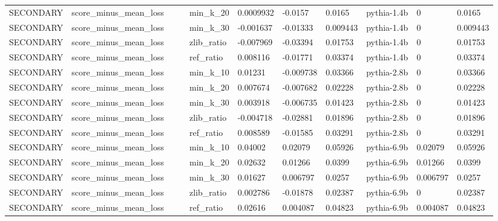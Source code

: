 \begin{tabular}{lllllllllll}
SECONDARY & score\_minus\_mean\_loss &  &  & min\_k\_20 & 0.0009932 & -0.0157 & 0.0165 & pythia-1.4b & 0 & 0.0165 \\
SECONDARY & score\_minus\_mean\_loss &  &  & min\_k\_30 & -0.001637 & -0.01333 & 0.009443 & pythia-1.4b & 0 & 0.009443 \\
SECONDARY & score\_minus\_mean\_loss &  &  & zlib\_ratio & -0.007969 & -0.03394 & 0.01753 & pythia-1.4b & 0 & 0.01753 \\
SECONDARY & score\_minus\_mean\_loss &  &  & ref\_ratio & 0.008116 & -0.01771 & 0.03374 & pythia-1.4b & 0 & 0.03374 \\
SECONDARY & score\_minus\_mean\_loss &  &  & min\_k\_10 & 0.01231 & -0.009738 & 0.03366 & pythia-2.8b & 0 & 0.03366 \\
SECONDARY & score\_minus\_mean\_loss &  &  & min\_k\_20 & 0.007674 & -0.007682 & 0.02228 & pythia-2.8b & 0 & 0.02228 \\
SECONDARY & score\_minus\_mean\_loss &  &  & min\_k\_30 & 0.003918 & -0.006735 & 0.01423 & pythia-2.8b & 0 & 0.01423 \\
SECONDARY & score\_minus\_mean\_loss &  &  & zlib\_ratio & -0.004718 & -0.02881 & 0.01896 & pythia-2.8b & 0 & 0.01896 \\
SECONDARY & score\_minus\_mean\_loss &  &  & ref\_ratio & 0.008589 & -0.01585 & 0.03291 & pythia-2.8b & 0 & 0.03291 \\
SECONDARY & score\_minus\_mean\_loss &  &  & min\_k\_10 & 0.04002 & 0.02079 & 0.05926 & pythia-6.9b & 0.02079 & 0.05926 \\
SECONDARY & score\_minus\_mean\_loss &  &  & min\_k\_20 & 0.02632 & 0.01266 & 0.0399 & pythia-6.9b & 0.01266 & 0.0399 \\
SECONDARY & score\_minus\_mean\_loss &  &  & min\_k\_30 & 0.01627 & 0.006797 & 0.0257 & pythia-6.9b & 0.006797 & 0.0257 \\
SECONDARY & score\_minus\_mean\_loss &  &  & zlib\_ratio & 0.002786 & -0.01878 & 0.02387 & pythia-6.9b & 0 & 0.02387 \\
SECONDARY & score\_minus\_mean\_loss &  &  & ref\_ratio & 0.02616 & 0.004087 & 0.04823 & pythia-6.9b & 0.004087 & 0.04823 \\
\bottomrule
\end{tabular}
